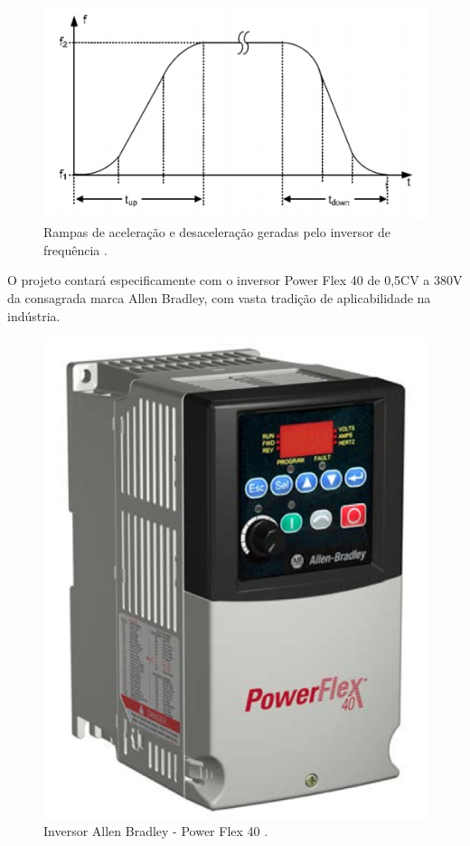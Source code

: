  \begin{figure}[h]
    \centering
    \label{oldr}
    \includegraphics[keepaspectratio=true,scale=0.75]{figuras/rampa_aceleracao.png}
    \caption{Rampas de aceleração e desaceleração geradas pelo inversor de frequência \cite{siemens}.}
    \end{figure}


        O projeto contará especificamente com o inversor Power Flex 40 de 0,5CV a 380V da consagrada marca Allen Bradley, com vasta tradição de aplicabilidade na indústria.


\begin{figure}[H]
  \centering
  \label{inversor_final}
  \includegraphics[keepaspectratio=true,scale=0.4]{figuras/inversor_final.png}
  \caption{Inversor Allen Bradley - Power Flex 40 \cite{allen}.}
\end{figure}

